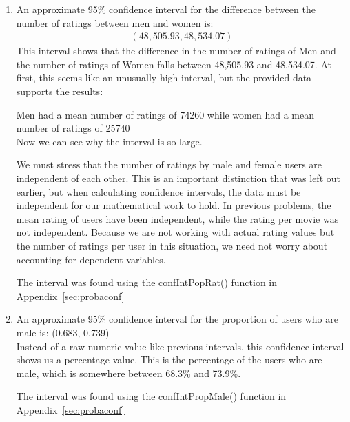 \documentclass[11pt]{article}  %
\begin{document}
\begin{enumerate}
    \item An approximate 95\% confidence interval for the difference between the number of ratings between men and women is:
    \begin{align*}
        (48,505.93, 48,534.07)
    \end{align*}
    This interval shows that the difference in the number of ratings of Men and the number of ratings of Women falls between 48,505.93 and 48,534.07. At first, this seems like an unusually high interval, but the provided data supports the results:

    Men had a mean number of ratings of 74260 while women had a mean number of ratings of 25740\\

    Now we can see why the interval is so large.
    
    We must stress that the number of ratings by male and female users are independent of each other. This is an important distinction that was left out earlier, but when calculating confidence intervals, the data must be independent for our mathematical work to hold. In previous problems, the mean rating of users have been independent, while the rating per movie was not independent. Because we are not working with actual rating values but the number of ratings per user in this situation, we need not worry about accounting for dependent variables.
    
    The interval was found using the confIntPopRat() function in Appendix~\ref{sec:probaconf}
    
    \item An approximate 95\% confidence interval for the proportion of users who are male is:
    (0.683, 0.739)\\
   Instead of a raw numeric value like previous intervals, this confidence interval shows us a percentage value. This is the percentage of the users who are male, which is somewhere between 68.3\% and 73.9\%.
    
    The interval was found using the confIntPropMale() function in Appendix~\ref{sec:probaconf}


\end{enumerate}
\end{document}
